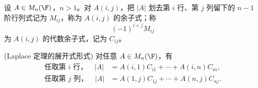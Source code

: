\begin{definition}\label{3.8.1}\label{p1:concept:c3-l2331}
	设 $A\in M_n(\F)$，$n>1$。对 $A(i,j)$，把 $|A|$ 划去第 $i$ 行、第 $j$ 列留下的 $n-1$ 阶行列式记为 $M_{ij}$，称为 $A(i,j)$ 的余子式；称
	\[
	(-1)^{i+j}M_{ij}
	\]
	为 $A(i,j)$ 的代数余子式，记为 $C_{ij}$。
\end{definition}

\begin{theorem}(Laplace 定理的展开式形式)\label{3.8.2}
	对任意 $A\in M_n(\F)$，有
	\[
	\begin{aligned}
		\text{任取第 }i\text{ 行，}
		\quad |A|&=A(i,1)C_{i1}+\cdots+A(i,n)C_{in},\\
		\text{任取第 }j\text{ 列，}
		\quad |A|&=A(1,j)C_{1j}+\cdots+A(n,j)C_{nj}.
	\end{aligned}
	\]
\end{theorem}

